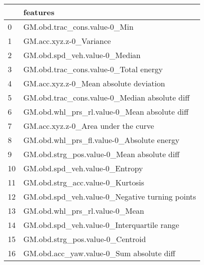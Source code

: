 \begin{tabular}{ll}
\toprule
{} &                                        features \\
\midrule
0  &                    GM.obd.trac\_cons.value-0\_Min \\
1  &                         GM.acc.xyz.z-0\_Variance \\
2  &                   GM.obd.spd\_veh.value-0\_Median \\
3  &           GM.obd.trac\_cons.value-0\_Total energy \\
4  &          GM.acc.xyz.z-0\_Mean absolute deviation \\
5  &   GM.obd.trac\_cons.value-0\_Median absolute diff \\
6  &    GM.obd.whl\_prs\_rl.value-0\_Mean absolute diff \\
7  &             GM.acc.xyz.z-0\_Area under the curve \\
8  &       GM.obd.whl\_prs\_fl.value-0\_Absolute energy \\
9  &      GM.obd.strg\_pos.value-0\_Mean absolute diff \\
10 &                  GM.obd.spd\_veh.value-0\_Entropy \\
11 &                GM.obd.strg\_acc.value-0\_Kurtosis \\
12 &  GM.obd.spd\_veh.value-0\_Negative turning points \\
13 &                  GM.obd.whl\_prs\_rl.value-0\_Mean \\
14 &      GM.obd.spd\_veh.value-0\_Interquartile range \\
15 &                GM.obd.strg\_pos.value-0\_Centroid \\
16 &        GM.obd.acc\_yaw.value-0\_Sum absolute diff \\
\bottomrule
\end{tabular}
